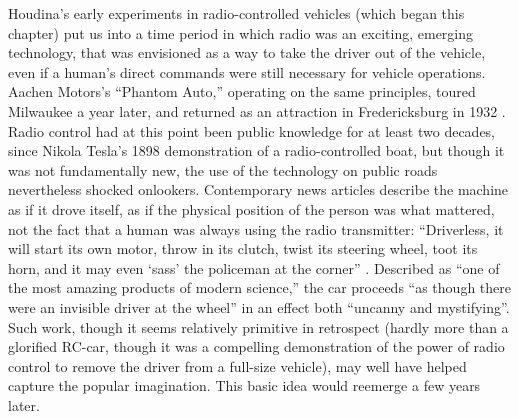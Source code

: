 Houdina's early experiments in radio-controlled vehicles (which began
this chapter) put us into a time period in which radio was an
exciting, emerging technology, that was envisioned as a way to take
the driver out of the vehicle, even if a human's direct commands were
still necessary for vehicle operations. Aachen Motors's ``Phantom
Auto,'' operating on the same principles, toured Milwaukee a year
later, \cite{phantomAuto} and returned as an attraction in
Fredericksburg in 1932 \cite{phantomAuto2}. 
Radio control had at this point been public knowledge for at least two
decades, since Nikola Tesla's 1898 demonstration of a radio-controlled
boat, but though it was not fundamentally new, the use of the
technology on public roads nevertheless shocked onlookers.
Contemporary news articles describe the machine as if it drove itself,
as if the physical position of the person was what mattered, not the
fact that a human was always using the radio transmitter:  ``Driverless,
it will start its own motor, throw in its clutch, twist its steering
wheel, toot its horn, and it may even `sass' the policeman at the
corner'' \cite{phantomAuto}. Described as ``one of the most amazing products of
modern science,'' the 
car proceeds ``as though there were an invisible driver at the wheel''
in an effect both ``uncanny and mystifying''\cite{phantomAuto2}. Such work,
though it seems relatively primitive in retrospect (hardly more than a
glorified RC-car, though it was a compelling demonstration of the
power of radio control to remove the driver from a full-size vehicle), may well have
helped capture the popular imagination. This basic idea would reemerge
a few years later.

